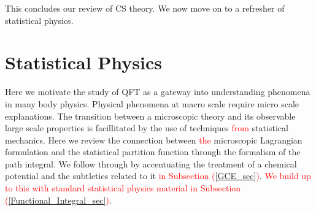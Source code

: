 This concludes our review of CS theory. We now move on to a refresher of statistical physics.


        \section{Statistical Physics}

        Here we motivate the study of QFT as a gateway into understanding phenomena in many body physics. Physical phenomena at macro scale require micro scale explanations. The transition between a microscopic theory and its observable large scale properties is facillitated by the use of techniques \textcolor{red}{from} statistical mechanics. Here we review the connection between \textcolor{red}{the} microscopic Lagrangian formulation and the statistical partition function through the formalism of the path integral. We follow through by accentuating the treatment of a chemical potential and the subtleties related to it \textcolor{red}{in Subsection (\ref{GCE_sec})}. \textcolor{red}{We build up to this with standard statistical physics material in Subsection (\ref{Functional_Integral_sec})}.\colorbox{red}{ }


